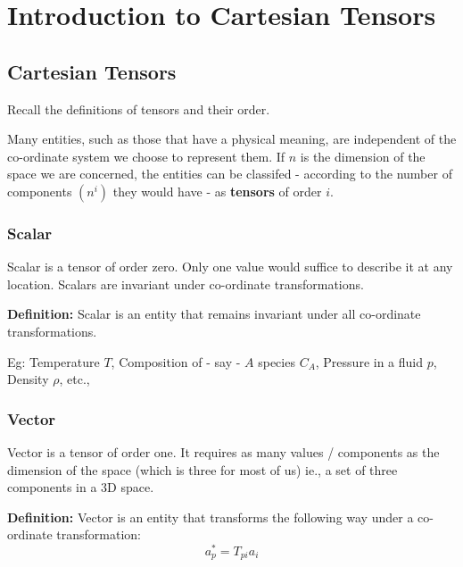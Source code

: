 \chapter{Introduction to Cartesian Tensors}
\label{ch:tensintro}

\section{Cartesian Tensors}

\begin{lo1}
Recall the definitions of tensors and their order.
\end{lo1}


Many entities, such as those that have a physical meaning, are independent of the co-ordinate system we choose to represent them.  If $n$ is the dimension of the space we are concerned, the entities can be classifed - according to the number of components $(n^i)$ they would have - as {\bf tensors} of order $i$. 




\subsection{Scalar}
Scalar is a tensor of order zero. Only one value would suffice to describe it at any location. Scalars are invariant under co-ordinate transformations.

{\bf Definition:} Scalar is an entity that remains invariant under all co-ordinate transformations.

Eg: Temperature $T$, Composition of - say - $A$ species $C_A$, Pressure in a fluid $p$, Density $\rho$, etc., 

\subsection{Vector}
Vector is a tensor of order one. It requires as many values / components as the dimension of the space (which is three for most of us) ie., a set of three components in a 3D space. 

{\bf Definition:} Vector is an entity that transforms the following way under a co-ordinate transformation: 
\begin{equation}
a^*_p = T_{pi}a_i
\end{equation} 

